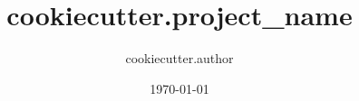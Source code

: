 \documentclass[10pt, t]{beamer}
\title{ {{cookiecutter.project_name}} }
\author{ {{cookiecutter.author}} }
\date{\today}
\begin{document}
\begin{frame}
	\maketitle
\end{frame}

\begin{acronym}
\end{acronym}
\end{document}

